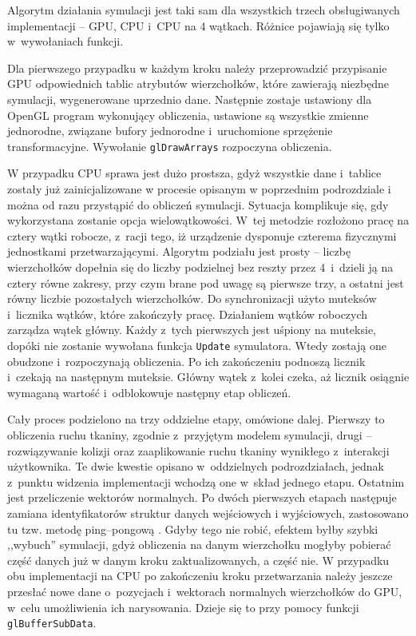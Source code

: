 		Algorytm działania symulacji jest taki sam dla wszystkich trzech obsługiwanych implementacji -- GPU, CPU i~CPU na 4 wątkach. Różnice pojawiają się tylko w~wywołaniach funkcji. 
		
		Dla pierwszego przypadku w każdym kroku należy przeprowadzić przypisanie GPU odpowiednich tablic atrybutów wierzchołków, które zawierają niezbędne symulacji, wygenerowane uprzednio dane. Następnie zostaje ustawiony dla OpenGL program wykonujący obliczenia, ustawione są wszystkie zmienne jednorodne, związane bufory jednorodne i~uruchomione sprzężenie transformacyjne. Wywołanie \texttt{glDrawArrays} rozpoczyna obliczenia. 
		
		W przypadku CPU sprawa jest dużo prostsza, gdyż wszystkie dane i~tablice zostały już zainicjalizowane w procesie opisanym w poprzednim podrozdziale i można od razu przystąpić do obliczeń symulacji. Sytuacja komplikuje się, gdy wykorzystana zostanie opcja wielowątkowości. W~tej metodzie rozłożono pracę na cztery wątki robocze, z~racji tego, iż urządzenie dysponuje czterema fizycznymi jednostkami przetwarzającymi. Algorytm podziału jest prosty -- liczbę wierzchołków dopełnia się do liczby podzielnej bez reszty przez 4~i~dzieli ją na cztery równe zakresy, przy czym brane pod uwagę są pierwsze trzy, a ostatni jest równy liczbie pozostałych wierzchołków. Do synchronizacji użyto muteksów i~licznika wątków, które zakończyły pracę. Działaniem wątków roboczych zarządza wątek główny. Każdy z~tych pierwszych jest uśpiony na muteksie, dopóki nie zostanie wywołana funkcja \texttt{Update} symulatora. Wtedy zostają one obudzone i~rozpoczynają obliczenia. Po ich zakończeniu podnoszą licznik i~czekają na następnym muteksie. Główny wątek z~kolei czeka, aż licznik osiągnie wymaganą wartość i~odblokowuje następny etap obliczeń.
		
		Cały proces podzielono na trzy oddzielne etapy, omówione dalej. Pierwszy to obliczenia ruchu tkaniny, zgodnie z~przyjętym modelem symulacji, drugi -- rozwiązywanie kolizji oraz zaaplikowanie ruchu tkaniny wynikłego z~interakcji użytkownika. Te dwie kwestie opisano w~oddzielnych podrozdziałach, jednak z~punktu widzenia implementacji wchodzą one w~skład jednego etapu. Ostatnim jest przeliczenie wektorów normalnych. Po dwóch pierwszych etapach następuje zamiana identyfikatorów struktur danych wejściowych i wyjściowych, zastosowano tu tzw. metodę ping--pongową \cite{receptury}. Gdyby tego nie robić, efektem byłby szybki ,,wybuch'' symulacji, gdyż obliczenia na danym wierzchołku mogłyby pobierać część danych już w danym kroku zaktualizowanych, a część nie. W przypadku obu implementacji na CPU po zakończeniu kroku przetwarzania należy jeszcze przesłać nowe dane o~pozycjach i~wektorach normalnych wierzchołków do GPU, w~celu umożliwienia ich narysowania. Dzieje się to przy pomocy funkcji \texttt{glBufferSubData}.
		
